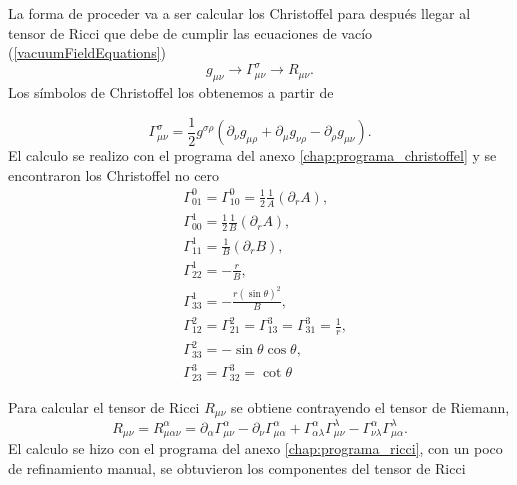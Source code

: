 La forma de proceder va a ser  calcular los Christoffel para después llegar al tensor de Ricci que debe de cumplir las ecuaciones de vacío (\ref{vacuumFieldEquations})
\begin{equation*}
    g_{\mu \nu} \rightarrow \Gamma_{\mu \nu}^\sigma \rightarrow R_{\mu \nu}.
\end{equation*}
Los símbolos de Christoffel los obtenemos a partir de

\begin{equation}
    \Gamma_{\mu \nu}^\sigma=\frac{1}{2} g^{\sigma \rho}\left(\partial_\nu g_{\mu \rho}+\partial_\mu g_{\nu \rho}-\partial_\rho g_{\mu \nu}\right).
\end{equation}
El calculo se realizo con el programa del anexo \ref{chap:programa_christoffel} y se encontraron los Christoffel no cero
\begin{equation}
    \begin{aligned}
         & \Gamma_{01}^0=\Gamma_{10}^0=\frac{1}{2} \frac{1}{A}\left(\partial_r A\right), \\
         & \Gamma_{00}^1=\frac{1}{2} \frac{1}{B}\left(\partial_r A\right),               \\
         & \Gamma_{11}^1=\frac{1}{B}\left(\partial_r B\right),                           \\
         & \Gamma_{22}^1=-\frac{r}{B},                                                   \\
         & \Gamma_{33}^1=-\frac{r(\sin \theta)^2}{B},                                    \\
         & \Gamma_{12}^2=\Gamma_{21}^2=\Gamma_{13}^3=\Gamma_{31}^3=\frac{1}{r},          \\
         & \Gamma_{33}^2=-\sin \theta \cos \theta,                                       \\
         & \Gamma_{23}^3=\Gamma_{32}^3=\cot \theta
    \end{aligned}
\end{equation}

Para calcular el tensor de Ricci $R_{\mu \nu}$ se obtiene contrayendo el tensor de Riemann,
\begin{equation}
    R_{\mu \nu}=R_{\mu \alpha \nu}^\alpha=\partial_\alpha \Gamma_{\mu \nu}^\alpha-\partial_\nu \Gamma_{\mu \alpha}^\alpha+\Gamma_{\alpha \lambda}^\alpha \Gamma_{\mu \nu}^\lambda-\Gamma_{\nu \lambda}^\alpha \Gamma_{\mu \alpha}^\lambda .
    \label{eq:ricci_tensor}
\end{equation}
El calculo se hizo con el programa del anexo \ref{chap:programa_ricci}, con un poco de refinamiento manual, se obtuvieron los componentes del tensor de Ricci

